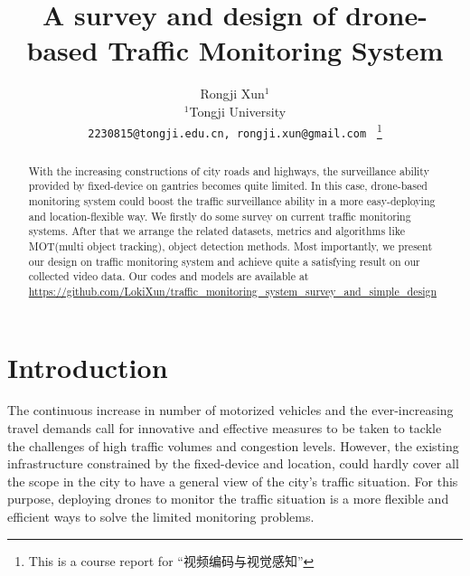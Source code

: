 \documentclass[10pt,twocolumn,letterpaper]{article}  %
\begin{document}
\date{}
\title{A survey and design of drone-based Traffic Monitoring System}

\author{Rongji Xun$^{1}$\\
	$^{1}$Tongji University\\
	{\tt\small 2230815@tongji.edu.cn, rongji.xun@gmail.com }
	\thanks{This is a course report for ``视频编码与视觉感知''}
}


\maketitle

\begin{abstract}
	With the increasing constructions of city roads and highways, the surveillance ability provided by fixed-device on gantries becomes quite limited. In this case, drone-based monitoring system could boost the traffic surveillance ability in a more easy-deploying and location-flexible way. We firstly do some survey on current traffic monitoring systems. After that we arrange the related datasets, metrics and algorithms like MOT(multi object tracking), object detection methods. Most importantly, we present our design on traffic monitoring system and achieve quite a satisfying result on our collected video data. Our codes and models are available at \url{https://github.com/LokiXun/traffic_monitoring_system_survey_and_simple_design}
\end{abstract}


\section{Introduction}
The continuous increase in number of motorized vehicles and the ever-increasing travel demands call for innovative and effective measures to be taken to tackle the challenges of high traffic volumes and congestion levels.\cite{khan2017uav} However, the existing infrastructure constrained by the fixed-device and location, could hardly cover all the scope in the city to have a general view of the city's traffic situation. For this purpose, deploying drones to monitor the traffic situation is a more flexible and efficient ways to solve the limited monitoring problems.
\end{document}
